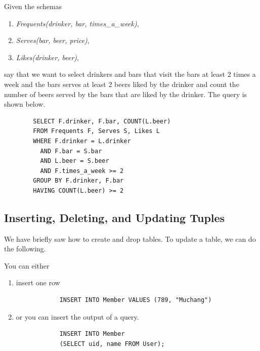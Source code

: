 \documentclass{article}
\begin{document}
    \begin{example}
      Given the schemas 
      \begin{enumerate}
        \item \textit{Frequents(drinker, bar, times\_a\_week)}, 
        \item \textit{Serves(bar, beer, price)}, 
        \item \textit{Likes(drinker, beer)}, 
      \end{enumerate}
      say that we want to select drinkers and bars that visit the bars at least 2 times a week and the bars serves at least 2 beers liked by the drinker and count the number of beers served by the bars that are liked by the drinker. The query is shown below. 

      \begin{lstlisting}
        SELECT F.drinker, F.bar, COUNT(L.beer) 
        FROM Frequents F, Serves S, Likes L 
        WHERE F.drinker = L.drinker
          AND F.bar = S.bar 
          AND L.beer = S.beer 
          AND F.times_a_week >= 2 
        GROUP BY F.drinker, F.bar 
        HAVING COUNT(L.beer) >= 2 
      \end{lstlisting}
    \end{example}

  \subsection{Inserting, Deleting, and Updating Tuples}

    We have briefly saw how to create and drop tables. To update a table, we can do the following. 

    \begin{definition}
      You can either 
      \begin{enumerate}
        \item insert one row  
          \begin{lstlisting}
            INSERT INTO Member VALUES (789, "Muchang")
          \end{lstlisting} 
        \item or you can insert the output of a query. 
          \begin{lstlisting}
            INSERT INTO Member 
            (SELECT uid, name FROM User); 
          \end{lstlisting}
      \end{enumerate}
    \end{definition}
\end{document}
